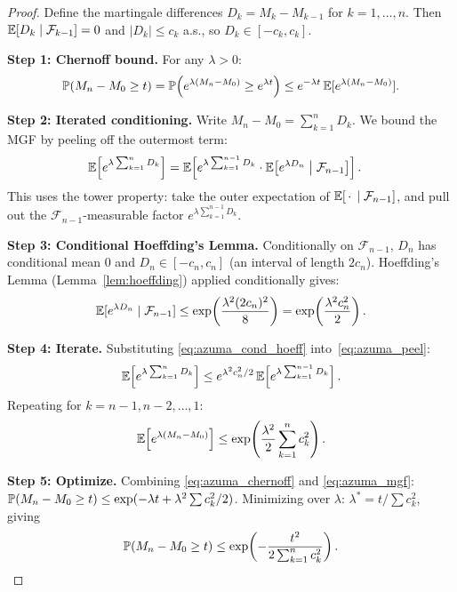 \documentclass[11pt,a4paper]{article}
\begin{document}
\begin{proof}
Define the martingale differences $D_k = M_k - M_{k-1}$ for
$k = 1, \ldots, n$.  Then
$\mathbb{E}[D_k \mid \mathcal{F}_{k-1}] = 0$ and
$|D_k| \leq c_k$ a.s., so $D_k \in [-c_k, c_k]$.

\textbf{Step 1: Chernoff bound.}
For any $\lambda > 0$:
\begin{equation}
  \mathbb{P}(M_n - M_0 \geq t)
  = \mathbb{P}\!\left(e^{\lambda(M_n - M_0)} \geq e^{\lambda t}\right)
  \leq e^{-\lambda t}\, \mathbb{E}[e^{\lambda(M_n - M_0)}].
  \label{eq:azuma_chernoff}
\end{equation}

\textbf{Step 2: Iterated conditioning.}
Write $M_n - M_0 = \sum_{k=1}^n D_k$.  We bound the MGF by
peeling off the outermost term:
\begin{align}
  \mathbb{E}\!\left[e^{\lambda \sum_{k=1}^n D_k}\right]
  &= \mathbb{E}\!\left[
    e^{\lambda \sum_{k=1}^{n-1} D_k}
    \cdot \mathbb{E}\!\left[e^{\lambda D_n}
      \;\middle|\; \mathcal{F}_{n-1}\right]
    \right].
  \label{eq:azuma_peel}
\end{align}
This uses the tower property: take the outer expectation of
$\mathbb{E}[\,\cdot\, \mid \mathcal{F}_{n-1}]$, and pull out the
$\mathcal{F}_{n-1}$-measurable factor
$e^{\lambda \sum_{k=1}^{n-1} D_k}$.

\textbf{Step 3: Conditional Hoeffding's Lemma.}
Conditionally on $\mathcal{F}_{n-1}$, $D_n$ has conditional mean
$0$ and $D_n \in [-c_n, c_n]$ (an interval of length $2c_n$).
Hoeffding's Lemma (Lemma~\ref{lem:hoeffding}) applied
conditionally gives:
\begin{equation}
  \mathbb{E}[e^{\lambda D_n} \mid \mathcal{F}_{n-1}]
  \leq \exp\!\left(\frac{\lambda^2 (2c_n)^2}{8}\right)
  = \exp\!\left(\frac{\lambda^2 c_n^2}{2}\right).
  \label{eq:azuma_cond_hoeff}
\end{equation}

\textbf{Step 4: Iterate.}
Substituting \eqref{eq:azuma_cond_hoeff}
into~\eqref{eq:azuma_peel}:
\begin{equation}
  \mathbb{E}\!\left[e^{\lambda \sum_{k=1}^n D_k}\right]
  \leq e^{\lambda^2 c_n^2/2}\,
    \mathbb{E}\!\left[e^{\lambda \sum_{k=1}^{n-1} D_k}\right].
\end{equation}
Repeating for $k = n-1, n-2, \ldots, 1$:
\begin{equation}
  \mathbb{E}\!\left[e^{\lambda(M_n - M_0)}\right]
  \leq \exp\!\left(\frac{\lambda^2}{2}
    \sum_{k=1}^n c_k^2\right).
  \label{eq:azuma_mgf}
\end{equation}

\textbf{Step 5: Optimize.}
Combining \eqref{eq:azuma_chernoff} and \eqref{eq:azuma_mgf}:
$\mathbb{P}(M_n - M_0 \geq t) \leq
\exp(-\lambda t + \lambda^2 \sum c_k^2 / 2)$.
Minimizing over $\lambda$:
$\lambda^* = t / \sum c_k^2$, giving
\begin{equation}
  \mathbb{P}(M_n - M_0 \geq t)
  \leq \exp\!\left(-\frac{t^2}{2\sum_{k=1}^n c_k^2}\right).
  \label{eq:azuma_one_side}
\end{equation}


\end{proof}
\end{document}
